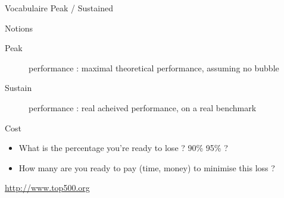 \begin{Frame}{Vocabulaire Peak / Sustained }

  \begin{block}{Notions}
    \begin{description}
    \item[Peak] performance : maximal theoretical performance, assuming
      no bubble
    \item[Sustain] performance : real acheived performance, on a real
      benchmark
  \end{description}
  \end{block}

  \begin{block}{Cost}
    \begin{itemize}
    \item What is the percentage you're ready to lose ? 90\% 95\% ?
    \item How many are you ready to pay (time, money) to minimise this
      loss ?
    \end{itemize}

\url{http://www.top500.org}
    
  \end{block}
\end{Frame}


